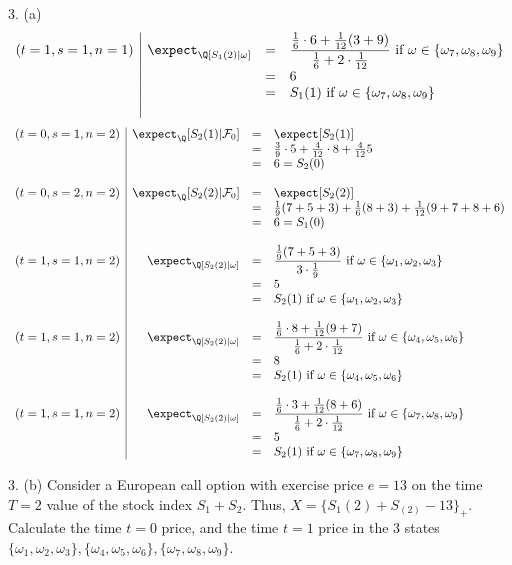 \documentclass[11pt,a4paper]{article}
\begin{document}
\begin{answer}{3. (a)}
\[\begin{array}{r|rcl}
    (t=1,s=1,n=1)&\expect_\Q[S_1(2)|\omega]&=&\dfrac{\frac16\cdot 6+\frac1{12}(3+9)}{\frac16+2\cdot\frac1{12}}\text{ if }\omega\in\{\omega_7,\omega_8,\omega_9\}\\
    &&=&6\\
    &&=&S_1(1)\text{ if }\omega\in\{\omega_7,\omega_8,\omega_9\}\\\\
  \end{array}\]
  \[\begin{array}{r|rcl}
    (t=0,s=1,n=2)&\expect_\Q[S_2(1)|\mathcal{F}_0]&=&\expect[S_2(1)]\\
    &&=&\frac39\cdot5+\frac4{12}\cdot8+\frac4{12}5\\
    &&=&6=S_2(0)\\\\

    (t=0,s=2,n=2)&\expect_\Q[S_2(2)|\mathcal{F}_0]&=&\expect[S_2(2)]\\
    &&=&\frac19(7+5+3)+\frac16(8+3)+\frac1{12}(9+7+8+6)\\
    &&=&6=S_1(0)\\\\

    (t=1,s=1,n=2)&\expect_\Q[S_2(2)|\omega]&=&\dfrac{\frac19(7+5+3)}{3\cdot\frac19}\text{ if }\omega\in\{\omega_1,\omega_2,\omega_3\}\\
    &&=&5\\
    &&=&S_2(1)\text{ if }\omega\in\{\omega_1,\omega_2,\omega_3\}\\\\

    (t=1,s=1,n=2)&\expect_\Q[S_2(2)|\omega]&=&\dfrac{\frac16\cdot 8+\frac1{12}(9+7)}{\frac16+2\cdot\frac1{12}}\text{ if }\omega\in\{\omega_4,\omega_5,\omega_6\}\\
    &&=&8\\
    &&=&S_2(1)\text{ if }\omega\in\{\omega_4,\omega_5,\omega_6\}\\\\

    (t=1,s=1,n=2)&\expect_\Q[S_2(2)|\omega]&=&\dfrac{\frac16\cdot 3+\frac1{12}(8+6)}{\frac16+2\cdot\frac1{12}}\text{ if }\omega\in\{\omega_7,\omega_8,\omega_9\}\\
    &&=&5\\
    &&=&S_2(1)\text{ if }\omega\in\{\omega_7,\omega_8,\omega_9\}
  \end{array}\]
\end{answer}

\begin{question}{3. (b)}
  Consider a European call option with exercise price $e=13$ on the time $T=2$ value of the stock index $S_1+S_2$. Thus,  $X=\{S_1(2)+S_(2)-13\}_+$. Calculate the time $t=0$ price, and the time $t=1$ price in the 3 states $\{\omega_1,\omega_2,\omega_3\},\{\omega_4,\omega_5,\omega_6\},\{\omega_7,\omega_8,\omega_9\}$.
\end{question}
\end{document}
